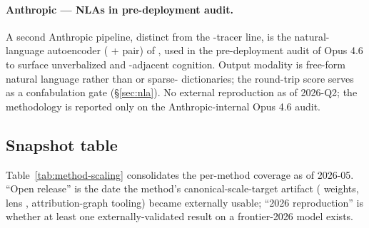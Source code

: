 \paragraph{Anthropic --- NLAs in pre-deployment audit.}
A second Anthropic pipeline, distinct from the -tracer line, is
the natural-language autoencoder ( +  pair) of
\citet{anthropic2026-nla}, used in the pre-deployment audit of 
Opus 4.6 to surface unverbalized  and
-adjacent cognition. Output modality is free-form natural
language rather than  or sparse- dictionaries; the
round-trip  score serves as a confabulation gate
(\S\ref{sec:nla}). No external reproduction as of 2026-Q2; the
methodology is reported only on the Anthropic-internal Opus 4.6 audit.

\subsection{Snapshot table}
\label{sec:scaling-snapshot-table}

Table~\ref{tab:method-scaling} consolidates the per-method coverage as
of 2026-05. ``Open release'' is the date the method's
canonical-scale-target artifact ( weights, lens ,
attribution-graph tooling) became externally usable; ``2026
reproduction'' is whether at least one externally-validated result on
a frontier-2026 model exists.

